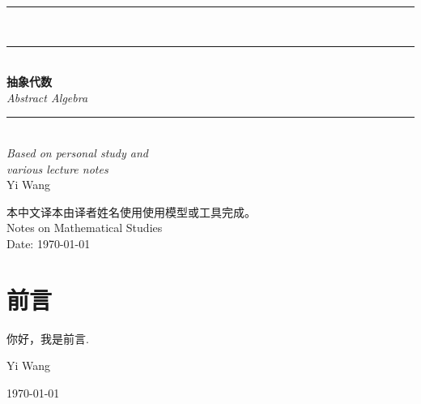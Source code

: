 \documentclass[UTF8,12pt,fontset=fandol]{ctexart}
\newcommand{\TranslationEditor}{译者姓名}
\newcommand{\TranslationTool}{使用模型或工具}
\newcommand{\TranslationCreditLine}{本中文译本由\TranslationEditor 使用\TranslationTool 完成。}
\theoremstyle{plain}
\begin{document}
\begin{titlepage}
    \flushleft

    \rule{\textwidth}{1.2pt} \\[0.1cm]
    \rule{\textwidth}{0.8pt} \\[1.5cm]

    \hspace{2cm} {\fontsize{45pt}{60pt}\selectfont \bfseries 抽象代数} \\[0.8cm]
    \hspace{2cm} {\fontsize{25pt}{30pt}\selectfont \textit{Abstract Algebra}} \\[1.5cm]

    \rule{\textwidth}{0.6pt} \\[2cm]

    \hspace{2cm} {\large \textit{Based on personal study and}} \\
    \hspace{2cm} {\large \textit{various lecture notes}} \\[3cm]

    \hspace{2cm} {\Huge \normalfont\upshape Yi Wang} \\[6cm]

    \vfill

    \begin{flushright}
        {\small \TranslationCreditLine} \\
        {\small Notes on Mathematical Studies} \\
        {\small Date: \today}
    \end{flushright}

    \vspace*{1cm}
\end{titlepage}

\setcounter{page}{1}

\section*{前言}

\vspace{0.5cm}

你好，我是前言.

\vspace*{0.5cm}
\hfill Yi Wang

\hfill \today

\newpage
\end{document}
